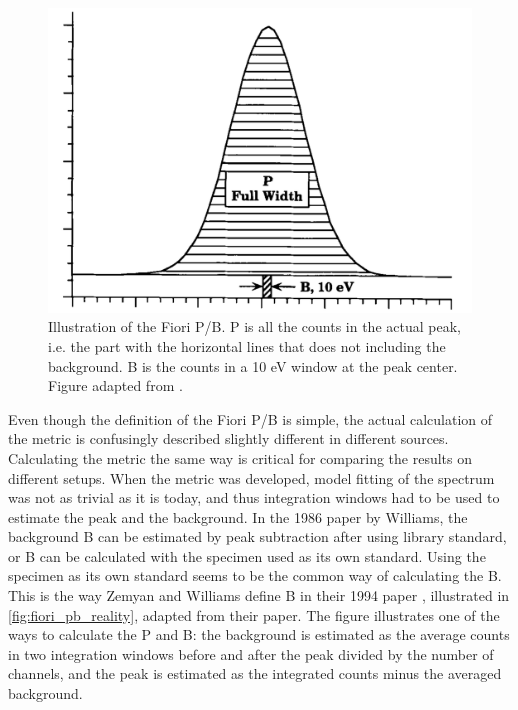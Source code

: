 \begin{figure}[htbp]
    \centering
    \includegraphics[width=0.6\linewidth]{figures/FioriPB_TODO_remake.png}
    \caption{
        Illustration of the Fiori P/B.
        P is all the counts in the actual peak, i.e. the part with the horizontal lines that does not including the background.
        B is the counts in a 10 eV window at the peak center.
        Figure adapted from \cite{zemyan_standard_performance_1994}.
        }
    \label{fig:fiori_pb}
\end{figure}

Even though the definition of the Fiori P/B is simple, the actual calculation of the metric is confusingly described slightly different in different sources.
Calculating the metric the same way is critical for comparing the results on different setups.
When the metric was developed, model fitting of the spectrum was not as trivial as it is today, and thus integration windows had to be used to estimate the peak and the background.
In the 1986 paper by Williams, the background B can be estimated by peak subtraction after using library standard, or B can be calculated with the specimen used as its own standard.
Using the specimen as its own standard seems to be the common way of calculating the B.
This is the way Zemyan and Williams define B in their 1994 paper \cite{zemyan_standard_performance_1994}, illustrated in  \cref{fig:fiori_pb_reality}, adapted from their paper.
The figure illustrates one of the ways to calculate the P and B: the background is estimated as the average counts in two integration windows before and after the peak divided by the number of channels, and the peak is estimated as the integrated counts minus the averaged background.




